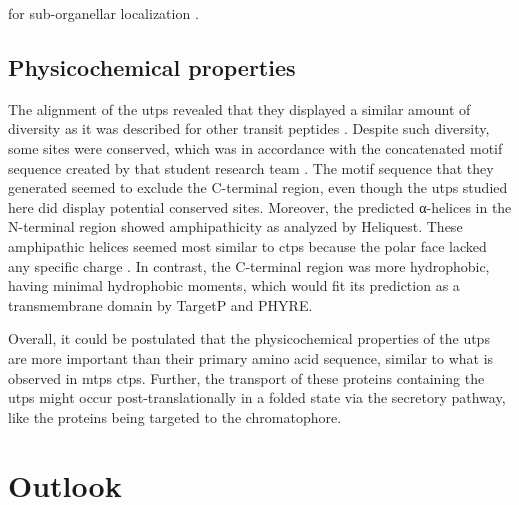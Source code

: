 for sub-organellar localization  \parencite{purrinos_nitroblast_2024}.

\subsection{Physicochemical properties}
The alignment of the \gls{utp}s revealed that they displayed a similar amount of diversity as it was described for other transit peptides \parencite{lee_understanding_2021, huang_refining_2009}. Despite such diversity, some sites were conserved, which was in accordance with the concatenated motif sequence created by that student research team \parencite{purrinos_nitroblast_2024}. The motif sequence that they generated seemed to exclude the C-terminal region, even though the \gls{utp}s studied here did display potential conserved sites. Moreover, the predicted α-helices in the N-terminal region showed amphipathicity as analyzed by Heliquest. These amphipathic helices seemed most similar to \gls{ctps} because the polar face lacked any specific charge \parencite{bruce_chloroplast_2000}. In contrast, the C-terminal region was more hydrophobic, having minimal hydrophobic moments, which would fit its prediction as a transmembrane domain by TargetP and PHYRE. 

Overall, it could be postulated that the physicochemical properties of the \gls{utp}s are more important than their primary amino acid sequence, similar to what is observed in \gls{mtps} \gls{ctps}. Further, the transport of these proteins containing the \gls{utp}s might occur post-translationally in a folded state via the secretory pathway, like the proteins being targeted to the chromatophore. 
\section{Outlook}
